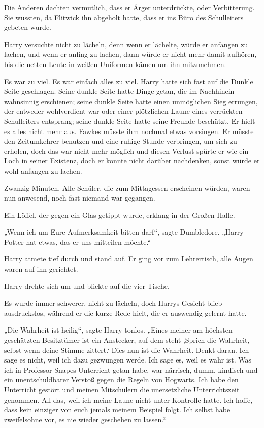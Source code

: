 Die Anderen dachten vermutlich, dass er Ärger unterdrückte, oder Verbitterung. Sie wussten, da Flitwick ihn abgeholt hatte, dass er ins Büro des Schulleiters gebeten wurde. 

Harry versuchte nicht zu lächeln, denn wenn er lächelte, würde er anfangen zu lachen, und wenn er anfing zu lachen, dann würde er nicht mehr damit aufhören, bis die netten Leute in weißen Uniformen kämen um ihn mitzunehmen. 

Es war zu viel. Es war einfach alles zu viel. Harry hatte sich fast auf die Dunkle Seite geschlagen. Seine dunkle Seite hatte Dinge getan, die im Nachhinein wahnsinnig erschienen; seine dunkle Seite hatte einen unmöglichen Sieg errungen, der entweder wohlverdient war oder einer plötzlichen Laune eines verrückten Schulleiters entsprang; seine dunkle Seite hatte seine Freunde beschützt. Er hielt es alles nicht mehr aus. Fawkes müsste ihm nochmal etwas vorsingen. Er müsste den Zeitumkehrer benutzen und eine ruhige Stunde verbringen, um sich zu erholen, doch das war nicht mehr möglich und diesen Verlust spürte er wie ein Loch in seiner Existenz, doch er konnte nicht darüber nachdenken, sonst würde er wohl anfangen zu lachen. 

Zwanzig Minuten. Alle Schüler, die zum Mittagessen erscheinen würden, waren nun anwesend, noch fast niemand war gegangen. 

Ein Löffel, der gegen ein Glas getippt wurde, erklang in der Großen Halle. 

„Wenn ich um Eure Aufmerksamkeit bitten darf“, sagte Dumbledore. „Harry Potter hat etwas, das er uns mitteilen möchte.“ 

Harry atmete tief durch und stand auf. Er ging vor zum Lehrertisch, alle Augen waren auf ihn gerichtet. 

Harry drehte sich um und blickte auf die vier Tische. 

Es wurde immer schwerer, nicht zu lächeln, doch Harrys Gesicht blieb ausdruckslos, während er die kurze Rede hielt, die er auswendig gelernt hatte. 

„Die Wahrheit ist heilig“, sagte Harry tonlos. „Eines meiner am höchsten geschätzten Besitztümer ist ein Anstecker, auf dem steht ‚Sprich die Wahrheit, selbst wenn deine Stimme zittert.‘ Dies nun ist die Wahrheit. Denkt daran. Ich sage es nicht, weil ich dazu gezwungen werde. Ich sage es, weil es wahr ist. Was ich in Professor Snapes Unterricht getan habe, war närrisch, dumm, kindisch und ein unentschuldbarer Verstoß gegen die Regeln von Hogwarts. Ich habe den Unterricht gestört und meinen Mitschülern die unersetzliche Unterrichtszeit genommen. All das, weil ich meine Laune nicht unter Kontrolle hatte. Ich hoffe, dass kein einziger von euch jemals meinem Beispiel folgt. Ich selbst habe zweifelsohne vor, es nie wieder geschehen zu lassen.“ 

